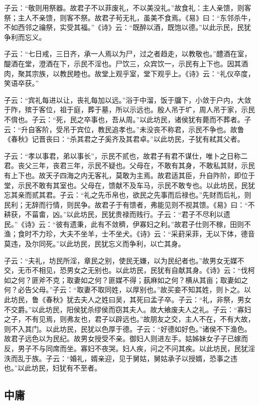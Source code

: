\documentclass[]{article}
\begin{document}
子云：``敬则用祭器。故君子不以菲废礼，不以美没礼。''故食礼：主人亲馈，则客祭；主人不亲馈，则客不祭。故君子茍无礼，虽美不食焉。《易》曰：``东邻杀牛，不如西邻之禴祭，实受其福。''《诗》云：``既醉以酒，既饱以德。''以此示民，民犹争利而忘义。

子云：``七日戒，三日齐，承一人焉以为尸，过之者趋走，以教敬也。''醴酒在室，醍酒在堂，澄酒在下，示民不淫也。尸饮三，众宾饮一，示民有上下也。因其酒肉，聚其宗族，以教民睦也。故堂上观乎室，堂下观乎上。《诗》云：``礼仪卒度，笑语卒获。''

子云：``宾礼每进以让，丧礼每加以远。''浴于中溜，饭于牖下，小敛于户内，大敛于阼，殡于客位，祖于庭，葬于墓，所以示远也。殷人吊于圹，周人吊于家，示民不偝也。子云：``死，民之卒事也，吾从周。''以此坊民，诸侯犹有薨而不葬者。子云：``升自客阶，受吊于宾位，教民追孝也。''未没丧不称君，示民不争也。故鲁《春秋》记晋丧曰：``杀其君之子奚齐及其君卓。''以此坊民，子犹有弒其父者。

子云：``孝以事君，弟以事长''，示民不贰也，故君子有君不谋仕，唯卜之日称二君。丧父三年，丧君三年，示民不疑也。父母在，不敢有其身，不敢私其财，示民有上下也。故天子四海之内无客礼，莫敢为主焉。故君适其臣，升自阼阶，即位于堂，示民不敢有其室也。父母在，馈献不及车马，示民不敢专也。以此坊民，民犹忘其亲而贰其君。子云：``礼之先币帛也，欲民之先事而后禄也。''先财而后礼，则民利；无辞而行情，则民争。故君子于有馈者，弗能见则不视其馈。《易》曰：``不耕获，不菑畬，凶。''以此坊民，民犹贵禄而贱行。子云：``君子不尽利以遗民。''《诗》云：``彼有遗秉，此有不敛穧，伊寡妇之利。''故君子仕则不稼，田则不渔；食时不力珍，大夫不坐羊，士不坐犬。《诗》云：``采葑采菲，无以下体，德音莫违，及尔同死。''以此坊民，民犹忘义而争利，以亡其身。

子云：``夫礼，坊民所淫，章民之别，使民无嫌，以为民纪者也。''故男女无媒不交，无币不相见，恐男女之无别也。以此坊民，民犹有自献其身。《诗》云：``伐柯如之何？匪斧不克；取妻如之何？匪媒不得；蓺麻如之何？横从其亩；取妻如之何？必告父母。''子云：``取妻不取同姓，以厚别也。''故买妾不知其姓，则卜之。以此坊民，鲁《春秋》犹去夫人之姓曰吴，其死曰孟子卒。子云：``礼，非祭，男女不交爵。''以此坊民，阳侯犹杀缪侯而窃其夫人。故大飨废夫人之礼。子云：``寡妇之子，不有见焉，则弗友也，君子以辟远也。''故朋友之交，主人不在，不有大故，则不入其门。以此坊民，民犹以色厚于德。子云：``好德如好色。''诸侯不下渔色。故君子远色以为民纪。故男女授受不亲。御妇人则进左手。姑姊妹女子子已嫁而反，男子不与同席而坐。寡妇不夜哭。妇人疾，问之不问其疾。以此坊民，民犹淫泆而乱于族。子云：``婚礼，婿亲迎，见于舅姑，舅姑承子以授婿，恐事之违也。''以此坊民，妇犹有不至者。

\hypertarget{header-n712}{%
\subsection{中庸 }\label{header-n712}}
\end{document}
